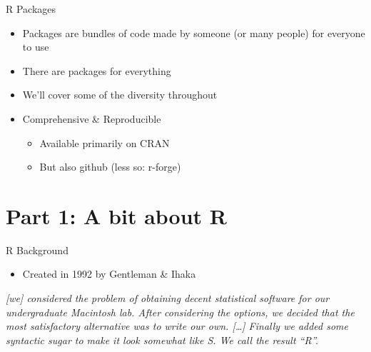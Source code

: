 \documentclass[ignorenonframetext,]{beamer}
\providecommand{\tightlist}{%
  \setlength{\itemsep}{0pt}\setlength{\parskip}{0pt}}
\begin{document}
\begin{frame}{R Packages}
\protect\hypertarget{r-packages}{}

\begin{itemize}
\tightlist
\item
  Packages are bundles of code made by someone (or many people) for
  everyone to use
\item
  There are packages for everything
\item
  We'll cover some of the diversity throughout
\item
  Comprehensive \& Reproducible

  \begin{itemize}
  \tightlist
  \item
    Available primarily on CRAN
  \item
    But also github (less so: r-forge)
  \end{itemize}
\end{itemize}

\end{frame}

\hypertarget{part-1-a-bit-about-r}{%
\section{Part 1: A bit about R}\label{part-1-a-bit-about-r}}

\begin{frame}{R Background}
\protect\hypertarget{r-background}{}

\begin{itemize}
\tightlist
\item
  Created in 1992 by Gentleman \& Ihaka
\end{itemize}

\emph{{[}we{]} considered the problem of obtaining decent statistical
software for our undergraduate Macintosh lab. After considering the
options, we decided that the most satisfactory alternative was to write
our own. {[}\ldots{}{]} Finally we added some syntactic sugar to make it
look somewhat like S. We call the result ``R''.}

\end{frame}
\end{document}
